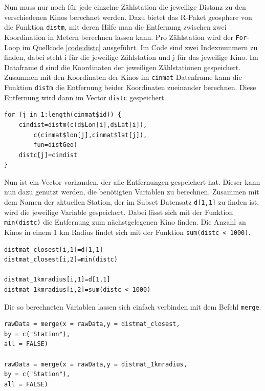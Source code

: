 \documentclass[a4paper,12pt]{thesis}
\begin{document}
Nun muss nur noch für jede einzelne Zählstation die jeweilige Distanz zu den verschiedenen Kinos berechnet werden. Dazu bietet das R-Paket \glqq{}geosphere\grqq{} von \cite{Hijmans2021} die Funktion \lstinline|distm|, mit deren Hilfe man die Entfernung zwischen zwei Koordination in Metern berechnen lassen kann. Pro Zählstation wird der \lstinline|For|-Loop im Quellcode \ref{code:distc} ausgeführt. Im Code sind zwei Indexnummern zu finden, dabei steht i für die jeweilige Zählstation und j für das jeweilige Kino. Im Dataframe \lstinline|d| sind die Koordinaten der jeweiligen Zählstationen gespeichert. Zusammen mit den Koordinaten der Kinos im \lstinline|cinmat|-Datenframe kann die Funktion \lstinline|distm| die Entfernung beider Koordinaten zueinander berechnen. Diese Entfernung wird dann im Vector \lstinline|distc| gespeichert.

\begin{minipage}{\linewidth}
\begin{lstlisting}[caption={Berechnung der Entfernung},label=code:distc]
for (j in 1:length(cinmat$id)) {
	cindist=distm(c(d$Lon[i],d$Lat[i]),
		c(cinmat$lon[j],cinmat$lat[j]), 
		fun=distGeo)
	distc[j]=cindist
}
\end{lstlisting}
\end{minipage}

Nun ist ein Vector vorhanden, der alle Entfernungen gespeichert hat. Dieser kann nun dazu genutzt werden, die benötigten Variablen zu berechnen. Zusammen mit dem Namen der aktuellen Station, der im Subset Datensatz \lstinline|d[1,1]| zu finden ist, wird die jeweilige Variable gespeichert. Dabei lässt sich mit der Funktion \lstinline|min(distc)| die Entfernung zum nächstgelegenen Kino finden. Die Anzahl an Kinos in einem 1 km Radius findet sich mit der Funktion \lstinline|sum(distc < 1000)|.

\begin{minipage}{\linewidth}
\begin{lstlisting}[caption={Berechnung der Entfernungsvariablen},label=code:dist_variables]
distmat_closest[i,1]=d[1,1]
distmat_closest[i,2]=min(distc)

distmat_1kmradius[i,1]=d[1,1]
distmat_1kmradius[i,2]=sum(distc < 1000)
\end{lstlisting}
\end{minipage}

Die so berechneten Variablen lassen sich einfach verbinden mit dem Befehl \lstinline|merge|.

\begin{minipage}{\linewidth}
\begin{lstlisting}[caption={Füge neue Variablen dem Datensatz hinzu},label=code:dist_variables2]
rawData = merge(x = rawData,y = distmat_closest,
by = c("Station"),
all = FALSE)

rawData = merge(x = rawData,y = distmat_1kmradius,
by = c("Station"),
all = FALSE)
\end{lstlisting}
\end{minipage}
\end{document}
